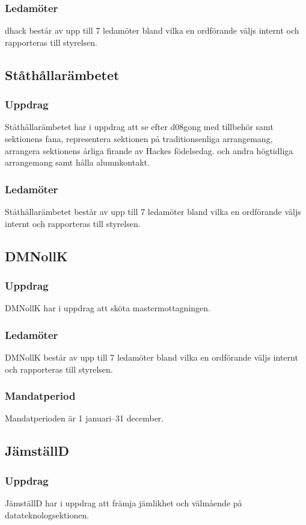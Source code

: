 \subsubsection{Ledamöter}
dhack består av upp till 7 ledamöter bland vilka en ordförande väljs internt och rapporteras till styrelsen.

\subsection{Ståthållarämbetet}
\subsubsection{Uppdrag}
Ståthållarämbetet har i uppdrag att se efter d08gong med tillbehör samt sektionens fana, representera sektionen på traditionsenliga arrangemang, arrangera sektionens årliga firande av Hackes födelsedag.
och andra högtidliga arrangemang samt hålla alumnkontakt.
\subsubsection{Ledamöter}
Ståthållarämbetet består av upp till 7 ledamöter bland vilka en ordförande väljs internt och rapporteras till styrelsen.

\subsection{DMNollK}
\subsubsection{Uppdrag}
DMNollK har i uppdrag att sköta mastermottagningen.
\subsubsection{Ledamöter}
DMNollK består av upp till 7 ledamöter bland vilka en ordförande väljs internt och rapporteras till styrelsen.
\subsubsection{Mandatperiod}
Mandatperioden är 1 januari--31 december.

\subsection{JämställD}
\subsubsection{Uppdrag}
JämställD har i uppdrag att främja jämlikhet och välmående på datateknologsektionen.
